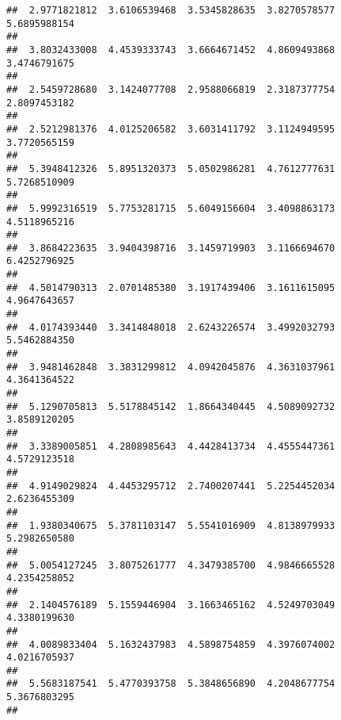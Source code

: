 \documentclass[]{article}
\begin{document}
\begin{verbatim}
##  2.9771821812  3.6106539468  3.5345828635  3.8270578577  5.6895988154 
##                                                                       
##  3.8032433008  4.4539333743  3.6664671452  4.8609493868  3.4746791675 
##                                                                       
##  2.5459728680  3.1424077708  2.9588066819  2.3187377754  2.8097453182 
##                                                                       
##  2.5212981376  4.0125206582  3.6031411792  3.1124949595  3.7720565159 
##                                                                       
##  5.3948412326  5.8951320373  5.0502986281  4.7612777631  5.7268510909 
##                                                                       
##  5.9992316519  5.7753281715  5.6049156604  3.4098863173  4.5118965216 
##                                                                       
##  3.8684223635  3.9404398716  3.1459719903  3.1166694670  6.4252796925 
##                                                                       
##  4.5014790313  2.0701485380  3.1917439406  3.1611615095  4.9647643657 
##                                                                       
##  4.0174393440  3.3414848018  2.6243226574  3.4992032793  5.5462884350 
##                                                                       
##  3.9481462848  3.3831299812  4.0942045876  4.3631037961  4.3641364522 
##                                                                       
##  5.1290705813  5.5178845142  1.8664340445  4.5089092732  3.8589120205 
##                                                                       
##  3.3389005851  4.2808985643  4.4428413734  4.4555447361  4.5729123518 
##                                                                       
##  4.9149029824  4.4453295712  2.7400207441  5.2254452034  2.6236455309 
##                                                                       
##  1.9380340675  5.3781103147  5.5541016909  4.8138979933  5.2982650580 
##                                                                       
##  5.0054127245  3.8075261777  4.3479385700  4.9846665528  4.2354258052 
##                                                                       
##  2.1404576189  5.1559446904  3.1663465162  4.5249703049  4.3380199630 
##                                                                       
##  4.0089833404  5.1632437983  4.5898754859  4.3976074002  4.0216705937 
##                                                                       
##  5.5683187541  5.4770393758  5.3848656890  4.2048677754  5.3676803295 
##                                                                       

\end{verbatim}
\end{document}
